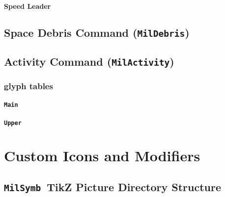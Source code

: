 \documentclass[a4paper, titlepage]{article}
\newcommand\MilSymb{\textbf{\texttt{MilSymb}}}
\begin{document}
\paragraph{Speed Leader}

\subsection{Space Debris Command (\textbf{\texttt{MilDebris}})}

\subsection{Activity Command (\textbf{\texttt{MilActivity}})}

\subsubsection{glyph tables}

\paragraph{\texttt{Main}}
%

\paragraph{\texttt{Upper}}
%

\section{Custom Icons and Modifiers}

\subsection{\MilSymb\  TikZ Picture Directory Structure}
\end{document}
